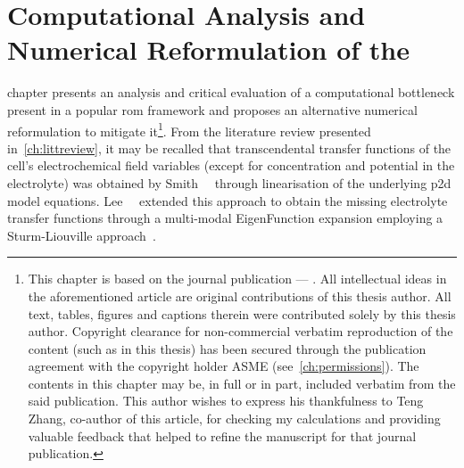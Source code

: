 
\graphicspath{{4/figures/}}

\chapter{Computational Analysis and Numerical Reformulation of the }\label{ch:improveddra}
\startcontents[chapters]

\bigskip

 chapter presents  an analysis and critical  evaluation of a
computational bottleneck present  in a popular \gls{rom}  framework and proposes
an  alternative numerical  reformulation  to  mitigate it\footnote{This  chapter
is  based  on the  journal  publication  --- .  All
intellectual ideas in  the aforementioned article are  original contributions of
this  thesis  author.  All  text,  tables, figures  and  captions  therein  were
contributed solely by this thesis author. Copyright clearance for non-commercial
verbatim  reproduction  of  the  content  (such as  in  this  thesis)  has  been
secured  through  the  publication  agreement with  the  copyright  holder  ASME
(see~\cref{ch:permissions}). The contents in this chapter  may be, in full or in
part,  included  verbatim from  the  said  publication.  This author  wishes  to
express  his  thankfulness  to  Teng  Zhang,  co-author  of  this  article,  for
checking my calculations  and providing valuable feedback that  helped to refine
the  manuscript  for that  journal  publication.}.  From the  literature  review
presented  in~\cref{ch:littreview},  it  may  be  recalled  that  transcendental
transfer  functions  of  the  cell's  electrochemical  field  variables  (except
for  concentration   and  potential   in  the   electrolyte)  was   obtained  by
Smith~\etal~\cite{Smith2007} through  linearisation of the  underlying \gls{p2d}
model  equations. Lee~\etal~\cite{Lee2012a,Lee2012}  extended  this approach  to
obtain  the  missing  electrolyte   transfer  functions  through  a  multi-modal
EigenFunction expansion employing a Sturm-Liouville approach~\cite{Pryce1993}.


